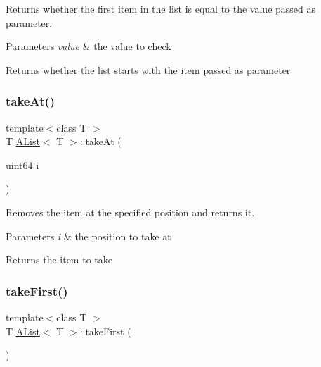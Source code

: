 Returns whether the first item in the list is equal to the value passed as parameter. 


\begin{DoxyParams}{Parameters}
{\em value} & the value to check \\
\hline
\end{DoxyParams}
\begin{DoxyReturn}{Returns}
whether the list starts with the item passed as parameter 
\end{DoxyReturn}
\mbox{\label{class_a_list_a26e974f6914da40b2e783edeac3c0665}} 
\subsubsection{\texorpdfstring{takeAt()}{takeAt()}}
{\footnotesize\ttfamily template$<$class T $>$ \\
T \mbox{\hyperlink{class_a_list}{A\+List}}$<$ T $>$\+::take\+At (\begin{DoxyParamCaption}\item[{uint64}]{i }\end{DoxyParamCaption})}



Removes the item at the specified position and returns it. 


\begin{DoxyParams}{Parameters}
{\em i} & the position to take at \\
\hline
\end{DoxyParams}
\begin{DoxyReturn}{Returns}
the item to take 
\end{DoxyReturn}
\mbox{\label{class_a_list_af2da906ed8c9bf282fc9f6f726864d9f}} 
\subsubsection{\texorpdfstring{takeFirst()}{takeFirst()}}
{\footnotesize\ttfamily template$<$class T $>$ \\
T \mbox{\hyperlink{class_a_list}{A\+List}}$<$ T $>$\+::take\+First (\begin{DoxyParamCaption}{ }\end{DoxyParamCaption})}



